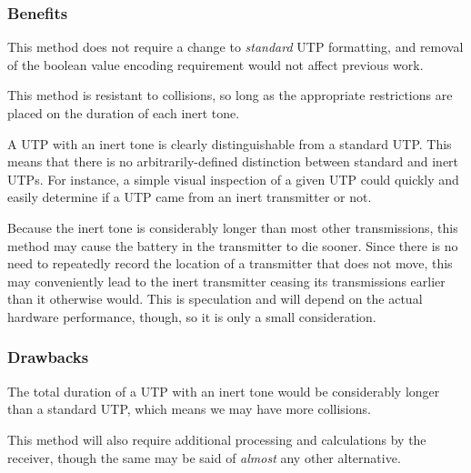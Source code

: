 \documentclass[12pt]{article}
\begin{document}
\subsubsection{Benefits}

This method does not require a change to {\em standard} UTP formatting, and
removal of the boolean value encoding requirement would not affect previous
work.

This method is resistant to collisions, so long as the appropriate restrictions
are placed on the duration of each inert tone.

A UTP with an inert tone is clearly distinguishable from a standard UTP.
This means that there is no arbitrarily-defined distinction between standard
and inert UTPs.
For instance, a simple visual inspection of a given UTP could quickly and
easily determine if a UTP came from an inert transmitter or not.

Because the inert tone is considerably longer than most other transmissions,
this method may cause the battery in the transmitter to die sooner.
Since there is no need to repeatedly record the location of a transmitter that
does not move, this may conveniently lead to the inert transmitter ceasing its
transmissions earlier than it otherwise would.
This is speculation and will depend on the actual hardware performance, though,
so it is only a small consideration.

\subsubsection{Drawbacks}

The total duration of a UTP with an inert tone would be considerably longer
than a standard UTP, which means we may have more collisions.

This method will also require additional processing and calculations by the
receiver, though the same may be said of {\em almost} any other alternative.

%
\end{document}
